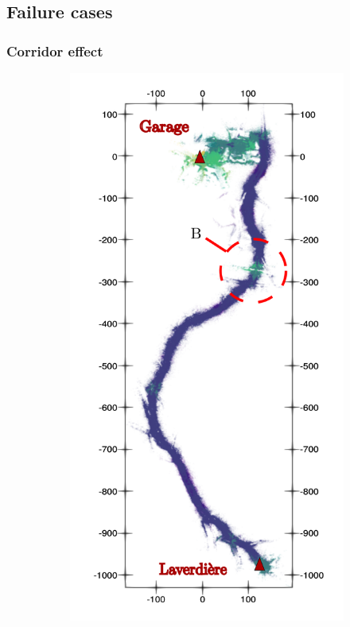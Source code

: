 \subsection{Failure cases}
\label{sec:fail}

\subsubsection{Corridor effect}
\label{sec:forest_canyon}

\lightlipsum[1]

\begin{figure}[h!]
	\begin{center}
		\begin{subfigure}[b]{0.3\textwidth}
			\includegraphics[width=\linewidth]{figs/forest_canyon/run5_perturbations.pdf}

\end{subfigure}
\end{center}
\end{figure}
